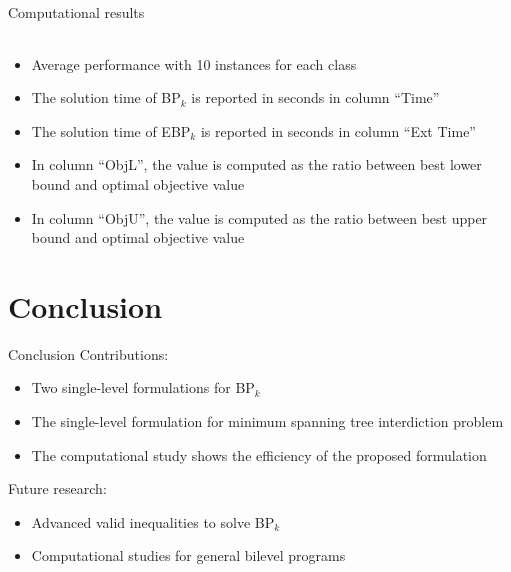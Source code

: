 \documentclass{beamer}
\begin{document}
\begin{frame}{Computational results}
\begin{table}[htbp]
\begin{adjustbox}{width=\columnwidth, height=0.25\textheight, center}
\begin{tabular}{rrrrccccrrrrrrrrrrrrrrrrrrr}
				\hline
			\end{tabular}%
		\end{adjustbox}
	\end{table}%
	\begin{itemize}
		\item Average performance with 10 instances for each class
		\item The solution time of BP$_k$ is reported in seconds in column ``Time''
		\item The solution time of EBP$_k$ is reported in seconds in column ``Ext Time''
		\item In column ``ObjL'', the value is computed as the ratio between  best lower bound and optimal objective value
		\item In column ``ObjU'', the value is computed as the ratio between  best upper bound and optimal objective value
	\end{itemize}
\end{frame}



\section{Conclusion}
\begin{frame}{Conclusion}
Contributions:
\begin{itemize}
	\item Two single-level formulations for BP$_k$
	\item The single-level formulation for minimum spanning tree interdiction problem
	\item The computational study shows the efficiency of the proposed formulation
\end{itemize}
	\vspace{0.4cm}

	Future research:
	\begin{itemize}
		\item Advanced valid inequalities to solve BP$_k$
		\item Computational studies for general bilevel programs
	\end{itemize}
\end{frame}
\end{document}
